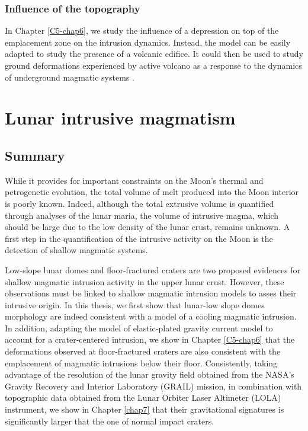 \subsubsection*{Influence of the topography}
\label{sec:topo}

In Chapter \ref{C5-chap6},  we study the influence of  a depression on
top of the  emplacement zone on the intrusion  dynamics.  Instead, the
model  can be  easily  adapted to  study the  presence  of a  volcanic
edifice.   It  could  then  be   used  to  study  ground  deformations
experienced  by  active volcano  as  a  response  to the  dynamics  of
underground                      magmatic                      systems
\citep{Cayol:2014vo,Pedersen:2004kp,Patane:2006hn,Bonaccorso:2001iw,ChadwickJr:1995cz,Cannavo:2015fk}.

\section*{Lunar intrusive magmatism}

\subsection*{Summary}
\label{sec:summary-1}

While it provides for important  constraints on the Moon's thermal and
petrogenetic evolution,  the total  volume of  melt produced  into the
Moon interior is  poorly known.  Indeed, although  the total extrusive
volume is quantified  through analyses of the lunar  maria, the volume
of intrusive  magma, which should be  large due to the  low density of
the lunar crust,  remains unknown. A first step  in the quantification
of the  intrusive activity  on the  Moon is  the detection  of shallow
magmatic systems.

Low-slope  lunar domes  and floor-fractured  craters are  two proposed
evidences for shallow  magmatic intrusion activity in  the upper lunar
crust. However, these observations must  be linked to shallow magmatic
intrusion models to asses their  intrusive origin.  In this thesis, we
first show that lunar-low slope domes morphology are indeed consistent
with a model  of a cooling magmatic intrusion.   In addition, adapting
the model  of elastic-plated  gravity current model  to account  for a
crater-centered intrusion, we show  in Chapter \ref{C5-chap6} that the
deformations observed  at floor-fractured craters are  also consistent
with  the  emplacement  of  magmatic  intrusions  below  their  floor.
Consistently, taking advantage of the  resolution of the lunar gravity
field  obtained   from  the  NASA’s  Gravity   Recovery  and  Interior
Laboratory  (GRAIL)  mission,  in combination  with  topographic  data
obtained from the Lunar Orbiter  Laser Altimeter (LOLA) instrument, we
show  in Chapter  \ref{chap7} that  their gravitational  signatures is
significantly larger that the one of normal impact craters.

